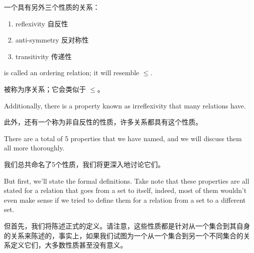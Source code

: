 一个具有另外三个性质的关系：

\begin{enumerate}
\item {}reflexivity 
\noindent  {}自反性
\item {}anti-symmetry 
\noindent  {}反对称性
\item {}transitivity
\noindent  {}传递性
\end{enumerate}

\noindent is called an ordering relation;
it will resemble $\leq$.

\noindent 被称为序关系；它会类似于 $\leq$。

Additionally, there is a property known as irreflexivity that many
relations have.

此外，还有一个称为非自反性的性质，许多关系都具有这个性质。

There are a total of 5 properties that we have named, and we will discuss
them all more thoroughly.

我们总共命名了5个性质，我们将更深入地讨论它们。

But first, we'll state the formal definitions.
Take note that these properties are all stated for a relation that goes
from a set to itself, indeed, most of them wouldn't even make sense if
we tried to define them for a relation from a set to a different set.

但首先，我们将陈述正式的定义。请注意，这些性质都是针对从一个集合到其自身的关系来陈述的，事实上，如果我们试图为一个从一个集合到另一个不同集合的关系定义它们，大多数性质甚至没有意义。

\clearpage

